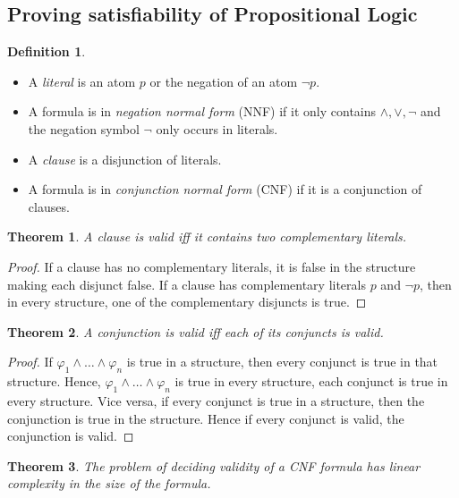 \documentclass[10pt,a4paper]{article}
\theoremstyle{definition}
\newtheorem{definition}{Definition}[section]
\newtheorem{theorem}{Theorem}
\begin{document}
\subsection{Proving satisfiability of Propositional Logic}
\begin{definition}
\begin{itemize}
	\item A \textit{literal} is an atom $p$ or the negation of an atom $\lnot p$.
	\item A formula is in \textit{negation normal form} (NNF) if it only contains $\land, \lor, \lnot$ and the negation symbol $\lnot$ only occurs in literals.
	\item A \textit{clause} is a disjunction of literals.
	\item A formula is in \textit{conjunction normal form} (CNF) if it is a conjunction of clauses.
\end{itemize}
\end{definition}

\begin{theorem}
\textit{A clause is valid iff it contains two complementary literals.}
\end{theorem}

\begin{proof}
If a clause has no complementary literals, it is false in the structure making each disjunct false. If a clause has complementary literals $p$ and $\lnot p$, then in every structure, one of the complementary disjuncts is true.
\end{proof}

\begin{theorem}
\textit{A conjunction is valid iff each of its conjuncts is valid.}
\end{theorem}

\begin{proof}
If $\varphi_1 \land \dots \land \varphi_n$ is true in a structure, then every conjunct is true in that structure. Hence, $\varphi_1 \land \dots \land \varphi_n$ is true in every structure, each conjunct is true in every structure. Vice versa, if every conjunct is true in a structure, then the conjunction is true in the structure. Hence if every conjunct is valid, the conjunction is valid.
\end{proof}

\begin{theorem}
\textit{The problem of deciding validity of a CNF formula has linear complexity in the size of the formula.}
\end{theorem}
\end{document}
